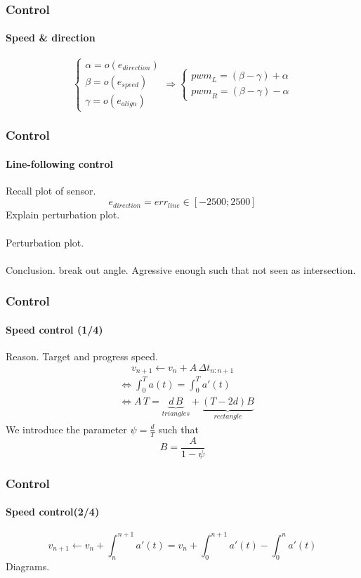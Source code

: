 \documentclass{beamer}
\begin{document}

\begin{frame}
\frametitle{Control}
\framesubtitle{Speed \& direction}
$$ 
\left\{
    \begin{array}{ll}
		\alpha = o(e_{direction}) \\[0.3cm]
		\beta = o(e_{speed}) \\[0.3cm]
		\gamma = o(e_{align})
	\end{array}
\right.
\Rightarrow
\left\{
    \begin{array}{ll}
		{pwm}_L =  (\beta -\gamma) + \alpha \\
		{pwm}_R = (\beta - \gamma) - \alpha
	\end{array}
\right.
$$
\end{frame}


\begin{frame}
\frametitle{Control}
\framesubtitle{Line-following control}
Recall plot of sensor. 
$$ 
e_{direction} =err_{line} \in [-2500;2500]
$$
Explain perturbation plot.\\~\\
Perturbation plot.\\~\\
Conclusion. break out angle. Agressive enough such that not seen as intersection.
\end{frame}


\begin{frame}
\frametitle{Control}
\framesubtitle{Speed control (1/4)}
Reason. Target and progress speed.
$$
v_{n+1} \leftarrow v_n + A \, \Delta t_{n:n+1}
$$
\begin{align*}
&\Leftrightarrow \int_{0}^{T}a(t) =  \int_{0}^{T}a'(t) \\
&\Leftrightarrow A\,T = \underbrace{d\,B}_{triangles} + \underbrace{(T - 2d)B}_{rectangle}
\end{align*}
We introduce the parameter $\psi = \frac{d}{T}$ such that
$$
\boxed{B = \frac{A}{1-\psi}} 
$$
\end{frame}


\begin{frame}
\frametitle{Control}
\framesubtitle{Speed control(2/4)}
$$
v_{n+1} \leftarrow v_n + \int_{n}^{n+1}a'(t) = v_n + \int_{0}^{n+1}a'(t) - \int_{0}^{n}a'(t)
$$
Diagrams.
\end{frame}
\end{document}
